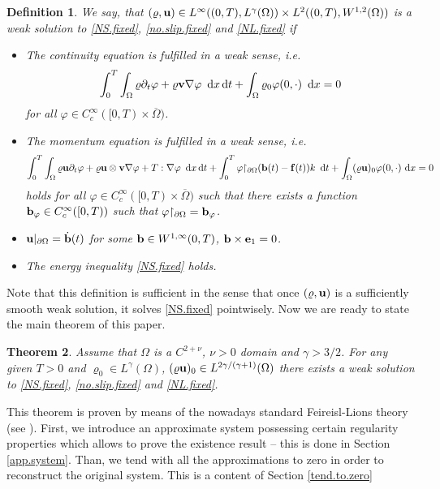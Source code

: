 \documentclass{article}
\newcommand{\dx}{\,\mathrm{d}x}
\newcommand{\dt}{\,\mathrm{d}t}
\newcommand{\bb}{{\bf b}}
\newcommand{\vb}{\bb}
\newcommand{\be}{{\bf e}}
\newcommand{\ve}{\be}
\newcommand{\bu}{{\bf u}}
\newcommand{\bv}{{\bf v}}
\newcommand{\pat}{\partial_t}
\newtheorem{theorem}{Theorem}[section]
\newtheorem{definition}[theorem]{Definition}
\numberwithin{equation}{section}
\begin{document}
\begin{definition}
We say, that $(\varrho,\bu)\in L^\infty((0,T),L^\gamma(\Omega))\times L^2((0,T),W^{1,2}(\Omega))$ is a weak solution to \eqref{NS.fixed}, \eqref{no.slip.fixed} and \eqref{NL.fixed} if
\begin{itemize}
\item The continuity equation is fulfilled in a weak sense, i.e.
$$
\int_0^T\int_{\Omega} \varrho \pat \varphi  + \varrho \bv \nabla \varphi \ \dx \dt + \int_\Omega \varrho_0\varphi(0,\cdot)\ \dx = 0
$$
for all $\varphi \in C^\infty_c([0,T)\times \overline \Omega)$.
\item The momentum equation is fulfilled in a weak sense, i.e.
$$
\int_0^T\int_\Omega \varrho \bu \pat \varphi  + \varrho \bu \otimes \bv \nabla \varphi + T:\nabla \varphi\ \dx \dt  + \int_0^T \varphi{\restriction_{\partial \Omega}} (\bb(t) - {\bf f}(t))k\ \dt+ \int_\Omega (\varrho \bu)_0\varphi(0,\cdot)\ {\rm d}x = 0
$$
holds for all $\varphi \in C^\infty_c([0,T)\times \overline \Omega)$ such that there exists a function $\bb_\varphi\in C^\infty_c([0,T))$ such that $\varphi{\restriction_{\partial \Omega}} = \bb_\varphi$.
\item $\bu|_{\partial \Omega} = \dot\bb(t)$ for some $\bb\in W^{1,\infty}(0,T)$, $\vb\times\ve_1 = 0$.
\item The energy inequality \eqref{NS.fixed} holds.
\end{itemize}
\end{definition}

Note that this definition is sufficient in the sense that once $(\varrho, \bu)$ is a sufficiently smooth weak solution, it solves \eqref{NS.fixed} pointwisely. Now we are ready to state the main theorem of this paper.

\begin{theorem}
Assume that $\Omega$ is a $C^{2+\nu}$, $\nu>0$ domain and $\gamma>3/2$. For any given $T>0$ and $\varrho_0\in L^\gamma(\Omega)$, $(\varrho \bu)_0\in L^{2\gamma/(\gamma+1)}(\Omega)$ there exists a weak solution to \eqref{NS.fixed}, \eqref{no.slip.fixed} and \eqref{NL.fixed}.
\end{theorem}

This theorem is proven by means of the nowadays standard Feireisl-Lions theory (see \cite{FeNoPe}). First, we introduce an approximate system possessing certain regularity properties which allows to prove the existence result -- this is done in Section \ref{app.system}. Than, we tend with all the approximations to zero in order to reconstruct the original system. This is a content of Section \ref{tend.to.zero}
\end{document}
